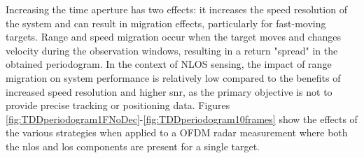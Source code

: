 		     Increasing the time aperture has two effects: it increases the speed resolution of the system and can result in migration effects, particularly for fast-moving targets. 
		     Range and speed migration occur when the target moves and changes velocity during the observation windows, resulting in a return "spread" in the obtained periodogram.
		     In the context of NLOS sensing, the impact of range migration on system performance is relatively low compared to the benefits of increased speed resolution and higher \gls{snr}, as the primary objective is not to provide precise tracking or positioning data.
			Figures \ref{fig:TDDperiodogram1FNoDec}-\ref{fig:TDDperiodogram10frames} show the effects of the various strategies when applied to a OFDM radar measurement where both the \gls{nlos} and \gls{los} components are present for a single target.
			
